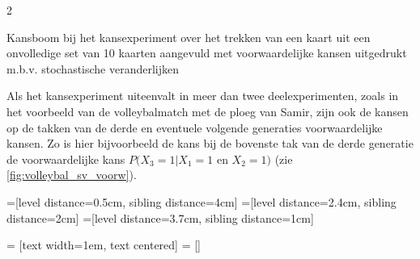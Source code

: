 \begin{multicols} {2}
\begin{afbeeldingenv}
\caption{Kansboom bij het kansexperiment over het
trekken van een kaart uit een onvolledige set van 10 kaarten aangevuld met voorwaardelijke kansen uitgedrukt m.b.v. stochastische veranderlijken}
\label{fig:kaart_sv_voorw}
\end{afbeeldingenv}
\vspace{0.5cm}

Als het kansexperiment uiteenvalt in meer dan twee deelexperimenten, zoals in het voorbeeld van de volleybalmatch met de ploeg van Samir, zijn ook de kansen op de takken van de derde en eventuele volgende generaties voorwaardelijke kansen. Zo is hier bijvoorbeeld de kans bij de bovenste tak van de derde generatie de voorwaardelijke kans $P(X_3=1|X_1=1$ en $X_2=1)$ (zie \autoref{fig:volleybal_sv_voorw}).

\newpage

=[level distance=0.5cm, sibling distance=4cm]
=[level distance=2.4cm, sibling distance=2cm]
=[level distance=3.7cm, sibling distance=1cm]


 = [text width=1em, text centered]
 = []


\end{multicols}
